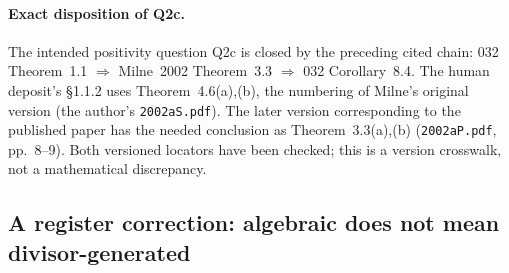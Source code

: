 \documentclass[11pt,a4paper]{article}
\theoremstyle{definition}
\theoremstyle{remark}
\begin{document}
\paragraph{Exact disposition of Q2c.}
The intended positivity question Q2c is closed by the preceding cited
chain: 032 Theorem~1.1 $\Rightarrow$ Milne~2002 Theorem~3.3 $\Rightarrow$
032 Corollary~8.4.  The human deposit's \S1.1.2 uses
Theorem~4.6(a),(b), the numbering of Milne's original version
(the author's \texttt{2002aS.pdf}).  The later version corresponding to
the published paper has the needed conclusion as Theorem~3.3(a),(b)
(\texttt{2002aP.pdf}, pp.~8--9).  Both versioned locators have been
checked; this is a version crosswalk, not a mathematical discrepancy.

\subsection{A register correction: algebraic does not mean divisor-generated}
\end{document}
